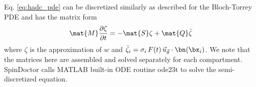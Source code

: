 Eq. \ref{eq:hadc_pde} can be discretized similarly as described for the Bloch-Torrey PDE and has the matrix form
\begin{equation}\label{eq:H_ADC_model}
    \mat{M} \frac{\partial \zeta}{\partial t} = -\mat{S}\zeta + \mat{Q}\bar{\zeta}
\end{equation}
where $\zeta$ is the approximation of $w$ and $\bar{\zeta}_i=\sigma_i\, F(t)\,\vec{u}_{\vec{g}}\cdot\bn(\bx_i)$. We note that the matrices here are assembled and solved separately for each compartment. SpinDoctor calls MATLAB built-in ODE routine ode23t to solve the semi-discretized equation.
